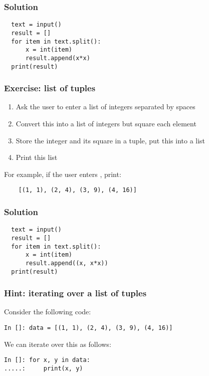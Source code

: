 \documentclass[14pt,compress]{beamer}
\begin{document}
\begin{frame}
\frametitle{Solution}
\begin{lstlisting}
  text = input()
  result = []
  for item in text.split():
      x = int(item)
      result.append(x*x)
  print(result)
\end{lstlisting}
\end{frame}

\begin{frame}
  \frametitle{Exercise: list of tuples}
  \begin{enumerate}
  \item Ask the user to enter a list of integers separated by spaces
  \item Convert this into a list of integers but square each element
  \item Store the integer and its square in a tuple, put this into a list
  \item Print this list
  \end{enumerate}
  For example, if the user enters , print:
  \begin{lstlisting}
    [(1, 1), (2, 4), (3, 9), (4, 16)]
  \end{lstlisting}
\end{frame}

\begin{frame}
\frametitle{Solution}
\begin{lstlisting}
  text = input()
  result = []
  for item in text.split():
      x = int(item)
      result.append((x, x*x))
  print(result)
\end{lstlisting}
\end{frame}

\begin{frame}
  \frametitle{Hint: iterating over a list of tuples}
  Consider the following code:
  \begin{small}
  \begin{lstlisting}
In []: data = [(1, 1), (2, 4), (3, 9), (4, 16)]
\end{lstlisting}
\end{small}
We can iterate over this as follows:
\begin{small}
\begin{lstlisting}
In []: for x, y in data:
.....:     print(x, y)
\end{lstlisting}
\end{small}
\end{frame}
\end{document}
